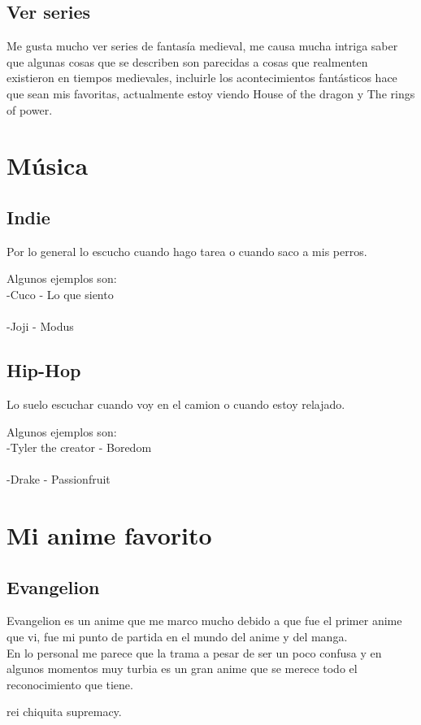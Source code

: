 \documentclass[letterpaper,pt12]{article}
\begin{document}
 \subsection{Ver series}
 Me gusta mucho ver series de fantasía medieval, me causa mucha intriga saber que algunas cosas que se describen son parecidas a cosas que realmenten existieron en tiempos medievales, incluirle los acontecimientos fantásticos hace que sean mis favoritas, actualmente estoy viendo House of the dragon y The rings of power.

\section{Música}

 \subsection{Indie}
 Por lo general lo escucho cuando hago tarea o cuando saco a mis perros.
 
 Algunos ejemplos son: \\
 -Cuco - Lo que siento \\
 \\
 -Joji - Modus
 
 \subsection{Hip-Hop}
 Lo suelo escuchar cuando voy en el camion o cuando estoy relajado.
 
 Algunos ejemplos son:\\
 -Tyler the creator - Boredom\\
 \\
 -Drake - Passionfruit
 
\section{\large Mi anime favorito}
\subsection{Evangelion}
{\tiny Evangelion es un anime que me marco mucho debido a que fue el primer anime que vi, fue mi punto de partida en el mundo del anime y del manga.\\

En lo personal me parece que la trama a pesar de ser un poco confusa y en algunos momentos muy turbia es un gran anime que se merece todo el reconocimiento que tiene.

rei chiquita supremacy.}
\end{document}
